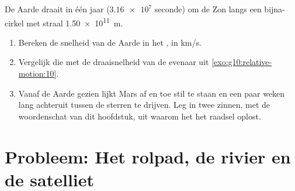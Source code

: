 \begin{exercise}[$\star\star\star$]\label{exo:g10:relative-motion:15}
De Aarde draait in één jaar ($\num{3.16e7}$ seconde) om de Zon langs een
bijna-cirkel met straal \qty{1.50e11}{m}.
\begin{enumerate}
  \item Bereken de snelheid van de Aarde in het ,
        in \unit{km/s}.
  \item Vergelijk die met de draaisnelheid van de evenaar uit
        \cref{exo:g10:relative-motion:10}.
  \item Vanaf de Aarde gezien lijkt Mars af en toe stil te staan en een
        paar weken lang achteruit tussen de sterren te drijven. Leg in
        twee zinnen, met de woordenschat van dit hoofdstuk, uit waarom
        het  het raadsel oplost.
\end{enumerate}
\end{exercise}

\section{Probleem: Het rolpad, de rivier en de satelliet}

